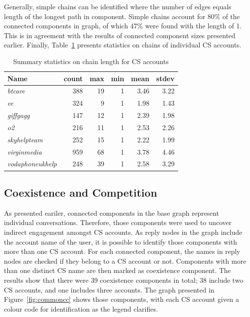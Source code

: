\documentclass[sigconf]{acmart}
\begin{document}
{Generally, simple chains can be identified where the number of edges
equals length of the longest path in component. Simple chains account
for 80\% of the connected components in graph, of which 47\% were
found with the length of 1. This is in agreement with the results of
connected component sizes presented earlier. Finally,
Table~\ref{tbl:delaystatscl} presents statistics on chains of
individual CS accounts.


\begin{table}[!h]
\centering
\begin{tabularx}{\columnwidth}{lrrrrr}
\toprule
\textbf{Name} & \textbf{count} & \textbf{max} & \textbf{min} & \textbf{mean} & \textbf{stdev}\\ 
\midrule
{\emph{btcare}} & 388 & 19 & 1 & 3.46 & 3.22\\
{\emph{ee}} & 324 & 9 & 1 & 1.98 & 1.43\\
{\emph{giffgagg}} & 147 & 12 & 1 & 2.39 & 1.98\\ 
{\emph{o2}} & 216 & 11 & 1 & 2.53 & 2.26\\
{\emph{skyhelpteam}} & 252 & 15 & 1 & 2.22 & 1.99\\
{\emph{virginmedia}} & 959 & 68 & 1 & 3.78 & 4.46\\
{\emph{vodaphoneukhelp}} & 248 & 39 & 1 & 2.58 & 3.29\\
\bottomrule
\end{tabularx}
\caption{Summary statistics on chain length for CS accounts}
\label{tbl:delaystatscl}
\end{table}

\subsection{Coexistence and Competition}

As presented eariler, connected components in the base graph represent 
individual conversations. Therefore, those components were used to uncover 
indirect engagement amongst CS accounts. As reply nodes in the graph
include the account name of the user, it is possible to identify those components with 
more than one CS account. For each connected component, the names in reply nodes
are checked if they belong to a CS account or not. Components with more than
one distinct CS name are then marked as coexistence component. The results show
that there were 39 coexistence components in total; 38 include two CS accounts, and one
includes three accounts. The graph presented in
Figure~\ref{fig:commoncc} shows those components, with each CS account
given a colour code for identification as the legend clarifies.

}
\end{document}
